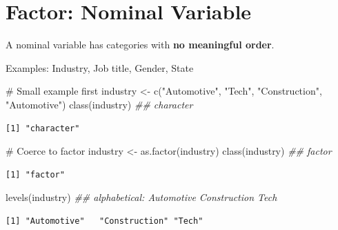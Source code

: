\documentclass[
  letterpaper,
  DIV=11,
  numbers=noendperiod]{scrreprt}
\newenvironment{Shaded}{\begin{snugshade}}{\end{snugshade}}
\newcommand{\CommentTok}[1]{\textcolor[rgb]{0.37,0.37,0.37}{#1}}
\newcommand{\DocumentationTok}[1]{\textcolor[rgb]{0.37,0.37,0.37}{\textit{#1}}}
\newcommand{\FunctionTok}[1]{\textcolor[rgb]{0.28,0.35,0.67}{#1}}
\newcommand{\NormalTok}[1]{\textcolor[rgb]{0.00,0.23,0.31}{#1}}
\newcommand{\OtherTok}[1]{\textcolor[rgb]{0.00,0.23,0.31}{#1}}
\newcommand{\StringTok}[1]{\textcolor[rgb]{0.13,0.47,0.30}{#1}}
\begin{document}
\section{Factor: Nominal Variable}\label{factor-nominal-variable}

A nominal variable has categories with \textbf{no meaningful order}.

Examples: Industry, Job title, Gender, State

\begin{Shaded}
\begin{Highlighting}[]
\CommentTok{\# Small example first}
\NormalTok{industry }\OtherTok{\textless{}{-}} \FunctionTok{c}\NormalTok{(}\StringTok{"Automotive"}\NormalTok{, }\StringTok{"Tech"}\NormalTok{, }\StringTok{"Construction"}\NormalTok{, }\StringTok{"Automotive"}\NormalTok{)}
\FunctionTok{class}\NormalTok{(industry)  }\DocumentationTok{\#\# \textquotesingle{}character\textquotesingle{}}
\end{Highlighting}
\end{Shaded}

\begin{verbatim}
[1] "character"
\end{verbatim}

\begin{Shaded}
\begin{Highlighting}[]
\CommentTok{\# Coerce to factor}
\NormalTok{industry }\OtherTok{\textless{}{-}} \FunctionTok{as.factor}\NormalTok{(industry)}
\FunctionTok{class}\NormalTok{(industry)  }\DocumentationTok{\#\# \textquotesingle{}factor\textquotesingle{}}
\end{Highlighting}
\end{Shaded}

\begin{verbatim}
[1] "factor"
\end{verbatim}

\begin{Shaded}
\begin{Highlighting}[]
\FunctionTok{levels}\NormalTok{(industry)  }\DocumentationTok{\#\# alphabetical: \textquotesingle{}Automotive\textquotesingle{} \textquotesingle{}Construction\textquotesingle{} \textquotesingle{}Tech\textquotesingle{}}
\end{Highlighting}
\end{Shaded}

\begin{verbatim}
[1] "Automotive"   "Construction" "Tech"        
\end{verbatim}
\end{document}
